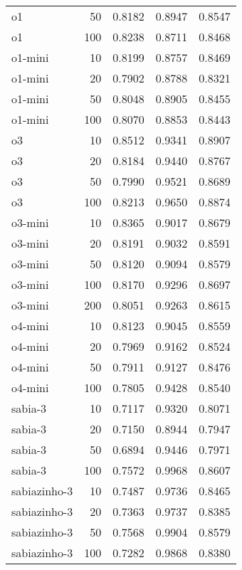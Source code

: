 \begin{tabular}{lrrrr}
o1 & 50 & 0.8182 & 0.8947 & 0.8547 \\
o1 & 100 & 0.8238 & 0.8711 & 0.8468 \\
o1-mini & 10 & 0.8199 & 0.8757 & 0.8469 \\
o1-mini & 20 & 0.7902 & 0.8788 & 0.8321 \\
o1-mini & 50 & 0.8048 & 0.8905 & 0.8455 \\
o1-mini & 100 & 0.8070 & 0.8853 & 0.8443 \\
o3 & 10 & 0.8512 & 0.9341 & 0.8907 \\
o3 & 20 & 0.8184 & 0.9440 & 0.8767 \\
o3 & 50 & 0.7990 & 0.9521 & 0.8689 \\
o3 & 100 & 0.8213 & 0.9650 & 0.8874 \\
o3-mini & 10 & 0.8365 & 0.9017 & 0.8679 \\
o3-mini & 20 & 0.8191 & 0.9032 & 0.8591 \\
o3-mini & 50 & 0.8120 & 0.9094 & 0.8579 \\
o3-mini & 100 & 0.8170 & 0.9296 & 0.8697 \\
o3-mini & 200 & 0.8051 & 0.9263 & 0.8615 \\
o4-mini & 10 & 0.8123 & 0.9045 & 0.8559 \\
o4-mini & 20 & 0.7969 & 0.9162 & 0.8524 \\
o4-mini & 50 & 0.7911 & 0.9127 & 0.8476 \\
o4-mini & 100 & 0.7805 & 0.9428 & 0.8540 \\
sabia-3 & 10 & 0.7117 & 0.9320 & 0.8071 \\
sabia-3 & 20 & 0.7150 & 0.8944 & 0.7947 \\
sabia-3 & 50 & 0.6894 & 0.9446 & 0.7971 \\
sabia-3 & 100 & 0.7572 & 0.9968 & 0.8607 \\
sabiazinho-3 & 10 & 0.7487 & 0.9736 & 0.8465 \\
sabiazinho-3 & 20 & 0.7363 & 0.9737 & 0.8385 \\
sabiazinho-3 & 50 & 0.7568 & 0.9904 & 0.8579 \\
sabiazinho-3 & 100 & 0.7282 & 0.9868 & 0.8380 \\
\bottomrule
\end{tabular}
